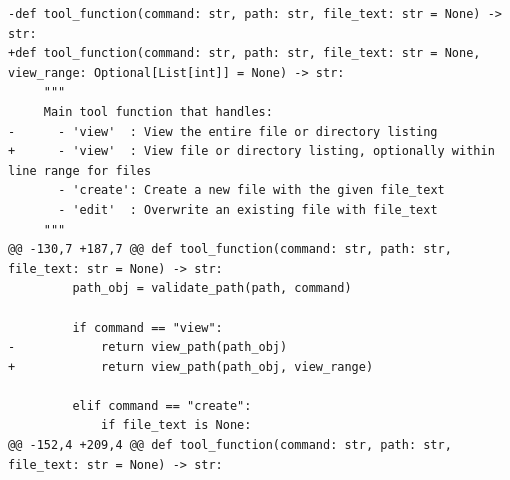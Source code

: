 \documentclass{article} %
\begin{document}
\begin{lstlisting}[style=diffstyle]
-def tool_function(command: str, path: str, file_text: str = None) -> str:
+def tool_function(command: str, path: str, file_text: str = None, view_range: Optional[List[int]] = None) -> str:
     """
     Main tool function that handles:
-      - 'view'  : View the entire file or directory listing
+      - 'view'  : View file or directory listing, optionally within line range for files
       - 'create': Create a new file with the given file_text
       - 'edit'  : Overwrite an existing file with file_text
     """
@@ -130,7 +187,7 @@ def tool_function(command: str, path: str, file_text: str = None) -> str:
         path_obj = validate_path(path, command)
 
         if command == "view":
-            return view_path(path_obj)
+            return view_path(path_obj, view_range)
 
         elif command == "create":
             if file_text is None:
@@ -152,4 +209,4 @@ def tool_function(command: str, path: str, file_text: str = None) -> str:
 

\end{lstlisting}
\end{document}
